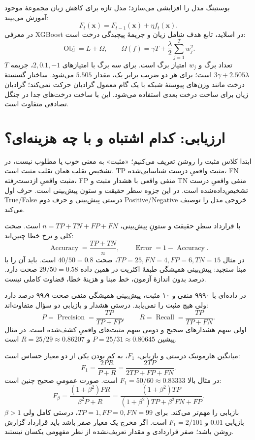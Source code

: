 بوستینگ مدل را افزایشی می‌سازد؛ مدل تازه برای کاهش زیان مجموعهٔ موجود آموزش می‌بیند:
\[F_t(\mathbf x)=F_{t-1}(\mathbf x)+\eta f_t(\mathbf x).\]
در معرفی XGBoost در اسلاید، تابع هدف شامل زیان و جریمهٔ پیچیدگی درخت است:
\[\operatorname{Obj}=L+\Omega,\qquad \Omega(f)=\gamma T+\frac\lambda2\sum_{j=1}^{T}w_j^2.\]
$T$ تعداد برگ و $w_j$ امتیاز برگ است. برای سه برگ با امتیازهای $2,0.1,-1$، جریمه $3\gamma+2.505\lambda$ است؛ برای هر دو ضریب برابر یک، مقدار $5.505$ می‌شود. ساختار گسستهٔ درخت مانند وزن‌های پیوستهٔ شبکه با یک گام معمول گرادیان حرکت نمی‌کند؛ گرادیان زیان برای ساخت درخت بعدی استفاده می‌شود. این با ساخت درخت‌های جدا در جنگل تصادفی متفاوت است.



\section{ارزیابی: کدام اشتباه و با چه هزینه‌ای؟}

ابتدا کلاس مثبت را روشن تعریف می‌کنیم؛ «مثبت» به معنی خوب یا مطلوب نیست، در تشخیص تقلب همان تقلب مثبت است. TP مثبت واقعیِ درست شناسایی‌شده، FN مثبت واقعیِ ازدست‌رفته، FP منفی واقعی با هشدار مثبت و TN منفی واقعیِ درست تشخیص‌داده‌شده است. در این جزوه سطر حقیقت و ستون پیش‌بینی است. حرف اول True/False درستی پیش‌بینی و حرف دوم Positive/Negative خروجی مدل را توصیف می‌کند.

با قرارداد سطرِ حقیقت و ستونِ پیش‌بینی، $n=TP+TN+FP+FN$ است. صحت کلی و نرخ خطا چنین‌اند:
\[\operatorname{Accuracy}=\frac{TP+TN}{n},\qquad \operatorname{Error}=1-\operatorname{Accuracy}.\]
در مثال $TP=25,FN=4,FP=6,TN=15$، صحت $40/50=0.8$ است. باید آن را با مبنا سنجید: پیش‌بینی همیشگی طبقهٔ اکثریت در همین داده $29/50=0.58$ صحت دارد. درصد بدون اندازهٔ آزمون، خط مبنا و هزینهٔ خطا، قضاوت کاملی نیست.

در داده‌ای با ۹۹۹۰ منفی و ۱۰ مثبت، پیش‌بینی همیشگی منفی صحت ۹۹٫۹ درصد دارد ولی هیچ مثبت را نمی‌یابد. درستی هشدار و بازیابی دو سؤال متفاوت‌اند:
\[P=\operatorname{Precision}=\frac{TP}{TP+FP},\qquad R=\operatorname{Recall}=\frac{TP}{TP+FN}.\]
اولی سهم هشدارهای صحیح و دومی سهم مثبت‌های واقعیِ کشف‌شده است. در مثال پیشین $P=25/31\approx0.80645$ و $R=25/29\approx0.86207$ است.

میانگین هارمونیک درستی و بازیابی، $F_1$، به کم بودن یکی از دو معیار حساس است:
\[F_1=\frac{2PR}{P+R}=\frac{2TP}{2TP+FP+FN}.\]
در مثال بالا $F_1=50/60\approx0.83333$ است. صورت عمومیِ صحیح چنین است:
\[F_\beta=\frac{(1+\beta^2)PR}{\beta^2P+R}=\frac{(1+\beta^2)TP}{(1+\beta^2)TP+\beta^2FN+FP}.\]
$\beta>1$ بازیابی را مهم‌تر می‌کند. برای $TP=1,FP=0,FN=99$، درستی کامل ولی بازیابی $0.01$ و $F_1=2/101$ است. اگر مخرج یک معیار صفر باشد باید قرارداد گزارش روشن باشد؛ صفر قراردادی و مقدار تعریف‌نشده از نظر مفهومی یکسان نیستند.

